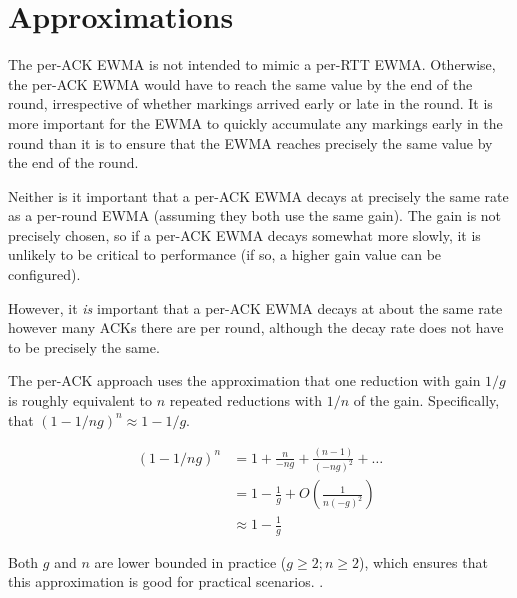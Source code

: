 \section{Approximations}\label{prresp_approx}

The per-ACK EWMA is not intended to mimic a per-RTT EWMA. Otherwise, the per-ACK EWMA would have to reach the same value by the end of the round, irrespective of whether markings arrived early or late in the round.
It is more important for the EWMA to quickly accumulate any markings early in the round than it is to ensure that the EWMA reaches precisely the same value by the end of the round. 

Neither is it important that a per-ACK EWMA decays at precisely the same rate as a per-round EWMA (assuming they both use the same gain). The gain is not precisely chosen, so if a per-ACK EWMA decays somewhat more slowly, it is unlikely to be critical to performance (if so, a higher gain value can be configured).

However, it \emph{is} important that a per-ACK EWMA decays at about the same rate however many ACKs there are per round, although the decay rate does not have to be precisely the same.

The per-ACK approach uses the approximation that one reduction with gain \(1/g\) is roughly equivalent to \(n\) repeated reductions with \(1/n\) of the gain. Specifically, that \((1 - 1/ng)^n \approx 1 - 1/g\).

\begin{align*}
(1 - 1/ng)^n &=       1 + \frac{n}{-ng} + \frac{(n-1)}{(-ng)^2} + \ldots \\
             &=       1 - \frac{1}{g} + O\left(\frac{1}{n(-g)^2}\right)\\
             &\approx 1 - \frac{1}{g}
\end{align*}

Both \(g\) and \(n\) are lower bounded in practice (\(g\ge2; n\ge2\)), which ensures that this approximation is good for practical scenarios.
.
